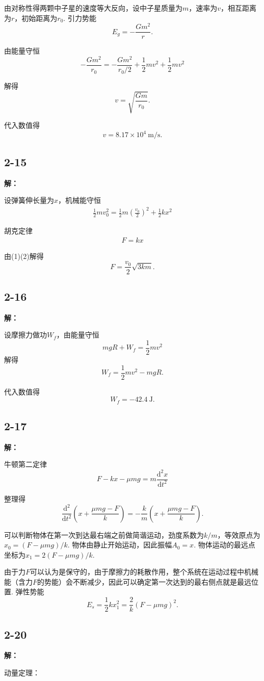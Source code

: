 \documentclass[twocolumn]{ctexart}
\newcommand{\sol}[1]{\subsection*{#1}\noindent\textbf{解：}

}
\begin{document}
	
	
	由对称性得两颗中子星的速度等大反向，设中子星质量为$m$，速率为$v$，相互距离为$r$，初始距离为$r_0$. 引力势能
	\setcounter{equation}{0}
	$$E_g=-\frac{Gm^2}{r}.$$

	由能量守恒
	$$-\frac{Gm^2}{r_0}=-\frac{Gm^2}{r_0/2}+\frac{1}{2}mv^2+\frac{1}{2}mv^2$$
	
	解得
	$$v=\sqrt{\frac{Gm}{r_0}}.$$
	
	代入数值得
	$$v=8.17\times 10^4\ \mathrm{m/s}.$$
	\sol{2-15}
	设弹簧伸长量为$x$，机械能守恒
	\setcounter{equation}{0}
	\begin{align}\frac{1}{2}mv_0^2=\frac{1}{2}m\left(\frac{v_0}{2}\right)^2+\frac{1}{2}kx^2\end{align}
	
	胡克定律
	\begin{align}F=kx\end{align}
	
	由(1)(2)解得
	$$F=\frac{v_0}{2}\sqrt{3km}.$$
	\sol{2-16}
	设摩擦力做功$W_f$，由能量守恒
	$$mgR+W_f=\frac{1}{2}mv^2$$
	解得
	$$W_f=\frac{1}{2}mv^2-mgR.$$
	
	代入数值得
	$$W_f=-42.4\ \mathrm{J}.$$
	\sol{2-17}
	牛顿第二定律
	$$F-kx-\mu mg=m\frac{\mathrm{d}^2x}{\mathrm{d}t^2}$$
	
	整理得
	$$\frac{\mathrm{d}^2}{\mathrm{d}t^2}\left(x+\frac{\mu mg-F}{k}\right)=-\frac{k}{m}\left(x+\frac{\mu mg-F}{k}\right).$$
	
	可以判断物体在第一次到达最右端之前做简谐运动，劲度系数为$k/m$，等效原点为$x_0=(F-\mu mg)/k$. 物体由静止开始运动，因此振幅$A_0=x$. 物体运动的最远点坐标为$x_1=2(F-\mu mg)/k$.
	
	由于力$F$可以认为是保守的，由于摩擦力的耗散作用，整个系统在运动过程中机械能（含力$F$的势能）会不断减少，因此可以确定第一次达到的最右侧点就是最远位置. 弹性势能
	$$E_s=\frac{1}{2}kx_1^2=\frac{2}{k}\left(F-\mu mg\right)^2.$$
	\sol{2-20}
	\noindent
	动量定理：
	
\end{document}
